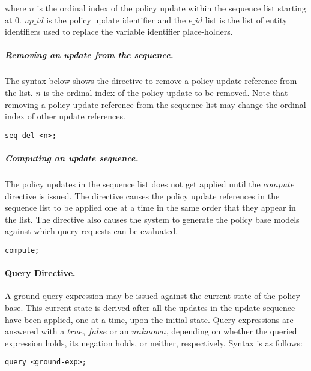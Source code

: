 \documentclass[10pt, twocolumn]{article}
\begin{document}
          \noindent where $n$ is the ordinal index of the policy update within
          the sequence list starting at 0. $up\_id$ is the policy update
          identifier and the $e\_id$ list is the list of entity identifiers
          used to replace the variable identifier place-holders.

        \subparagraph{Removing an update from the sequence.}
          The syntax below shows the directive to remove a policy update
          reference from the list. $n$ is the ordinal index of the policy
          update to be removed. Note that removing a policy update reference
          from the sequence list may change the ordinal index of other update
          references.

          \begin{verbatim}seq del <n>;\end{verbatim}

        \subparagraph{Computing an update sequence.}

          The policy updates in the sequence list does not get applied until
          the $compute$ directive is issued. The directive causes the policy
          update references in the sequence list to be applied one at a time in
          the same order that they appear in the list. The directive also
          causes the system to generate the policy base models against which
          query requests can be evaluated.

          \begin{verbatim}compute;\end{verbatim}

        \paragraph{Query Directive.}

          A ground query expression may be issued against the current state of
          the policy base. This current state is derived after all the updates
          in the update sequence have been applied, one at a time, upon the
          initial state. Query expressions are answered with a $true$, $false$
          or an $unknown$, depending on whether the queried expression holds,
          its negation holds, or neither, respectively. Syntax is as follows:

          \begin{verbatim}query <ground-exp>;\end{verbatim}
\end{document}
